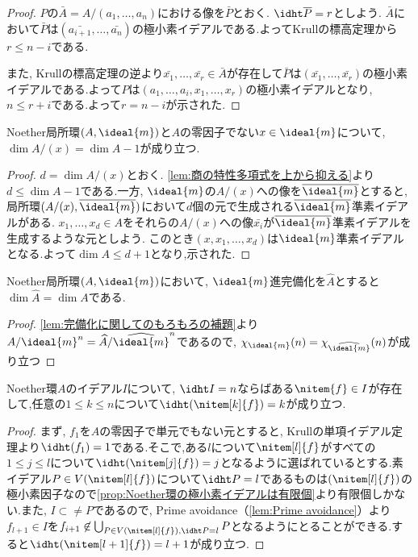 \begin{proof}
	$P$の$\bar{A}=A/(a_1,\dots,a_n)$における像を$\bar{P}$とおく. $\idht \bar{P}=r$としよう. $\bar{A}$において$\bar{P}$は$(\bar{a_{i+1}},\dots,\bar{a_n})$の極小素イデアルである.よってKrullの標高定理から$r\leq n-i$である.
	
	また, Krullの標高定理の逆より$\bar{x_1},\dots,\bar{x_r}\in\bar{A}$が存在して$\bar{P}$は$(\bar{x_1},\dots,\bar{x_r})$の極小素イデアルである.よって$P$は$(a_1,\dots,a_i,x_1,\dots,x_r)$の極小素イデアルとなり, $n\leq r+i$である.よって$r=n-i$が示された.
\end{proof}

\begin{prop}
	Noether局所環$(A,\ideal{m})$と$A$の零因子でない$x\in\ideal{m}$について, $\dim A/(x)=\dim A-1$が成り立つ.
\end{prop}

\begin{proof}
	$d=\dim A/(x)$とおく. \ref{lem:商の特性多項式を上から抑える}より$d\leq \dim A-1$である.一方, $\ideal{m}$の$A/(x)$への像を$\bar{\ideal{m}}$とすると,局所環$(A/(x),\bar{\ideal{m}})$において$d$個の元で生成される$\bar{\ideal{m}}$準素イデアルがある. $x_1,\dots,x_d\in A$をそれらの$A/(x)$への像$\bar{x_i}$が$\bar{\ideal{m}}$準素イデアルを生成するような元としよう. このとき$(x,x_1,\dots,x_d)$は$\ideal{m}$準素イデアルとなる.よって$\dim A\leq d+1$となり,示された.
\end{proof}

\begin{thm}\label{thm:完備化は次元を保つ}
	Noether局所環$(A,\ideal{m})$において, $\ideal{m}$進完備化を$\widehat{A}$とすると$\dim\widehat{A}=\dim A$である.
\end{thm}

\begin{proof}
	\ref{lem:完備化に関してのもろもろの補題}より$A/\ideal{m}^n=\widehat{A}/{\widehat{\ideal{m}}}^n$であるので, $\chi_{\ideal{m}}(n)=\chi_{\widehat{\ideal{m}}}(n)$が成り立つ
\end{proof}

\begin{prop}
	Noether環$A$のイデアル$I$について, $\idht I=n$ならばある$\nitem{f}\in I$が存在して,任意の$1\leq k\leq n$について$\idht (\nitem[k]{f})=k$が成り立つ.
\end{prop}

\begin{proof}
	まず, $f_1$を$A$の零因子で単元でもない元とすると, Krullの単項イデアル定理より$\idht (f_1)=1$である.そこで,ある$l$について$\nitem[l]{f}$がすべての$1\leq j\leq l$について$\idht (\nitem[j]{f})=j$となるように選ばれているとする.素イデアル$P\in V(\nitem[l]{f})$について$\idht P=l$であるものは$(\nitem[l]{f})$の極小素因子なので\ref{prop:Noether環の極小素イデアルは有限個}より有限個しかない.また, $I\subset\neq P$であるので, Prime avoidance（\ref{lem:Prime avoidance}）より$f_{l+1}\in I$を$f_{i+1}\not\in\bigcup_{P\in V(\nitem[l]{f}),\idht P=l} P$となるようにとることができる.すると$\idht (\nitem[l+1]{f})=l+1$が成り立つ.
\end{proof}

